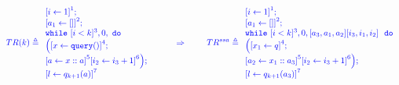 \documentclass[a4paper,11pt]{article}
\begin{document}
\begin{example}
\[
\jl{
TR(k) \triangleq
{
\begin{array}{l}
    \left[i \leftarrow 1 \right]^1 ; \\
    \left[a_1 \leftarrow [] \right]^2; \\
   \ewhile ~ [i < k]^{3}, 0,     ~ \edo ~ \\
    \Big(
     \clabel{x \leftarrow \query() }^4 ; \\
    \clabel{a \leftarrow x :: a }^5  
        \left[i_2 \leftarrow i_3 + 1 \right]^6 
   \Big);\\
    \clabel{l \leftarrow q_{k + 1}(a)}^{7}\\
\end{array}
}
%
~~~~~~~~ \Rightarrow ~~~~~~~
%
TR^{ssa} \triangleq
\begin{array}{l}
    \left[i \leftarrow 1 \right]^1 ; \\
    \left[a_1 \leftarrow [] \right]^2; \\
   \ewhile ~ [i < k]^{3}, 0, 
   [ a_3,a_1,a_2 ] [ i_3,i_1,i_2 ] ~ 
    ~ \edo ~ \\
   \Big( 
     \left[x_1 \leftarrow q \right]^4; \\
    \left[a_2 \leftarrow x_1 :: a_3 \right]^5 
    \left[i_2 \leftarrow i_3 + 1 \right]^6 
    \Big);\\
    \clabel{l \leftarrow q_{k + 1}(a_3)}^{7}\\
\end{array}
}
\]


\end{example}
\end{document}
